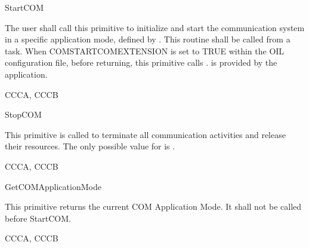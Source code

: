 \begin{function}{StartCOM}
  \begin{fundescription}
    The user shall call this primitive to initialize and start the  communication 
    system in a specific application mode, defined by . This routine 
    shall be called from a task. When COMSTARTCOMEXTENSION  is set to TRUE 
    within the OIL configuration file, before returning, this primitive calls 
    .  is provided by the 
    application.  
  \end{fundescription}
  \begin{funparameters}
  \end{funparameters}
  \begin{funreturn}
  \end{funreturn}
  \begin{funconformance}
    CCCA, CCCB
  \end{funconformance}
\end{function}

\begin{function}{StopCOM}
  \begin{fundescription}
    This primitive is called to terminate all communication activities and release
    their resources. 
    The only possible value for  is . 
  \end{fundescription}
  \begin{funparameters}
  \end{funparameters}
  \begin{funreturn}
  \end{funreturn}
  \begin{funconformance}
    CCCA, CCCB
  \end{funconformance}
\end{function}


\begin{function}{GetCOMApplicationMode}
  \begin{fundescription}
    This primitive returns the current COM Application Mode. It shall not be 
    called before StartCOM.
  \end{fundescription}
  \begin{funreturn}
  \end{funreturn}
  \begin{funconformance}
    CCCA, CCCB
  \end{funconformance}
\end{function}

